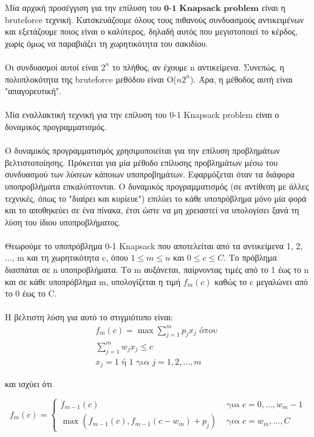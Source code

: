 \documentclass[12pt]{article}
\begin{document}
Μία αρχική προσέγγιση για την επίλυση του \(\textbf{0-1 Knapsack problem}\) είναι η bruteforce τεχνική. Κατσκευάζουμε όλους τους πιθανούς συνδυασμούς αντικειμένων και εξετάζουμε ποιος είναι ο καλύτερος, δηλαδή αυτός που μεγιστοποιεί το κέρδος, χωρίς όμως να παραβιάζει τη χωρητικότητα του σακιδίου. \\ \\

Οι συνδυασμοί αυτοί είναι \(2^{n}\) το πλήθος, αν έχουμε n αντικείμενα. Συνεπώς, η πολυπλοκότητα της bruteforce μεθόδου είναι O(\(n2^{n}\)). Άρα, η μέθοδος αυτή είναι "απαγορευτική". \\ \\

Μία εναλλακτική τεχνική για την επίλυση του 0-1 Knapsack problem είναι ο δυναμικός προγραμματισμός. \\ \\

Ο δυναμικός προγραμματισμός χρησιμοποιείται για την
επίλυση προβλημάτων βελτιστοποίησης. Πρόκειται για μία μέθοδο επίλυσης προβλημάτων μέσω του συνδυασμού των λύσεων κάποιων υποπροβημάτων. Εφαρμόζεται όταν τα διάφορα υποπροβλήματα επκαλύπτονται. Ο δυναμικός προγραμματισμός (σε αντίθεση με άλλες τεχνικές, όπως το "διαίρει και κυρίευε") επιλύει το κάθε υποπρόβλημα μόνο μία φορά και το αποθηκεύει σε ένα πίνακα, έτσι ώστε να μη χρειαστεί να υπολογίσει ξανά τη λύση του ίδιου υποπροβλήματος. \\ \\

Θεωρούμε το υποπρόβλημα 0-1 Knapsack που αποτελείται από τα αντικείμενα 1, 2, ..., m και τη χωρητικότητα c, όπου \(1 \leq m \leq n\) και \(0 \leq c \leq C\). Το πρόβλημα διασπάται σε n υποπροβλήματα. Το m αυξάνεται, παίρνοντας τιμές από το 1
έως το n και σε κάθε υποπρόβλημα m, υπολογίζεται η τιμή \(f_{m}(c)\) καθώς το
c μεγαλώνει από το 0 έως το C. \\ \\

Η βέλτιστη λύση για αυτό το στιγμιότυπο είναι: 
\begin{align*}
	f_{m}(c) = \max {\sum_{j=1}^{m}{p_{j}x_{j}}} \text{ όπου } \\
	\sum_{j=1}^{m}{w_{j}x_{j}} \leq c \\
	x_{j} = 1 \text{ ή } 1 \text{ για } j=1,2,...,m
\end{align*}

και ισχύει ότι

 \[ f_{m}(c) = 
\begin{cases} 
f_{m-1}(c) & \text{ για } c = 0,...,w_{m}-1 \\
\max \left( f_{m-1}(c), f_{m-1}(c-w_{m}) + p_{j} \right) & \text{ για } c = w_{m},...,C
\end{cases}
\]
\end{document}
